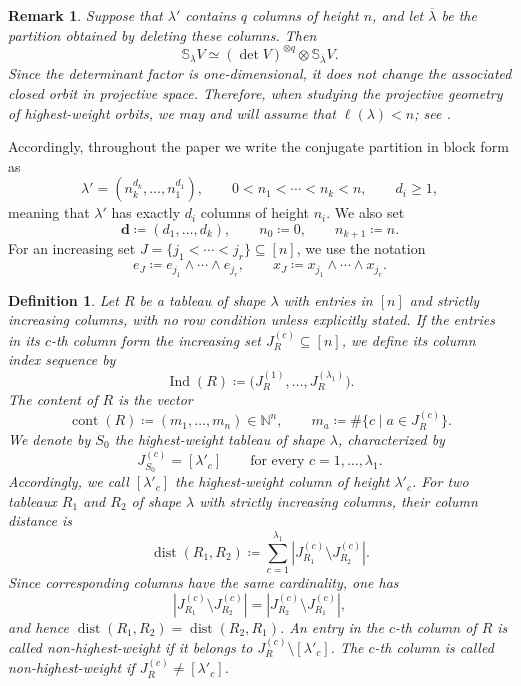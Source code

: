 \documentclass[a4paper,reqno]{amsart}
\theoremstyle{plainnopunct}
\theoremstyle{definitionnopunct}
\newtheorem{definition}[definition]{Definition}
\newtheorem{remark}[remark]{Remark}
\newcommand{\N}{\mathbb{N}}
\renewcommand{\S}{\mathbb{S}}
\newcommand{\ind}{\operatorname{Ind}}
\newcommand{\dist}{\operatorname{dist}}
\newcommand{\bd}{\mathbf{d}}
\DeclareMathOperator{\cont}{cont}
\begin{document}
\begin{remark}\label{rem: determinant twist}
Suppose that $\lambda'$ contains $q$ columns of height $n$, and let $\overline{\lambda}$ be the partition obtained by deleting these columns. Then
\[
\S_\lambda V
\simeq
(\det V)^{\otimes q}\otimes\S_{\overline{\lambda}}V.
\]
Since the determinant factor is one-dimensional, it does not change the associated closed orbit in projective space. Therefore, when studying the projective geometry of highest-weight orbits, we may and will assume that $\ell(\lambda)<n$; see \cite{FultonHarris1991}.
\end{remark}

Accordingly, throughout the paper we write the conjugate partition in block form as
\[\lambda'
=
(n_k^{d_k},\ldots,n_1^{d_1}),
\qquad
0<n_1<\cdots<n_k<n,
\qquad
d_i\geq1,
\]meaning that $\lambda'$ has exactly $d_i$ columns of height $n_i$. We also set
\[
\bd
\coloneq
(d_1,\ldots,d_k),
\qquad
n_0\coloneq0,
\qquad
n_{k+1}\coloneq n.
\]
For an increasing set 
$J=\{j_1<\cdots<j_r\}\subseteq[n]$,
we use the notation
\[
e_J
\coloneq
e_{j_1}\wedge\cdots\wedge e_{j_r},
\qquad
x_J
\coloneq
x_{j_1}\wedge\cdots\wedge x_{j_r}.
\]

\begin{definition}
\label{def: tableau data}
Let $R$ be a tableau of shape $\lambda$ with entries in $[n]$ and strictly increasing columns, with no row condition unless explicitly stated. If the entries in its $c$-th column form the increasing set $J_R^{(c)}\subseteq[n]$, we define its \emph{column index sequence} by
\[
\ind(R)
\coloneq
\bigl(
J_R^{(1)},\ldots,J_R^{(\lambda_1)}
\bigr).
\]
The \emph{content} of $R$ is the vector
\[
\cont(R)
\coloneq
(m_1,\ldots,m_n)\in\N^n,
\qquad
m_a
\coloneq
\#\bigl\{
c\mid a\in J_R^{(c)}
\bigr\}.
\]
We denote by $S_0$ the \emph{highest-weight tableau} of shape $\lambda$, characterized by
\[
J_{S_0}^{(c)}
=
[\lambda'_c]
\qquad
\text{for every }
c=1,\ldots,\lambda_1.
\]
Accordingly, we call $[\lambda'_c]$ the highest-weight column of height $\lambda'_c$.
For two tableaux $R_1$ and $R_2$ of shape $\lambda$ with strictly increasing columns, their \emph{column distance} is
\[
\dist(R_1,R_2)
\coloneq
\sum_{c=1}^{\lambda_1}
\left|
J_{R_1}^{(c)}
\setminus
J_{R_2}^{(c)}
\right|.
\]
Since corresponding columns have the same cardinality, one has
\[
\left|
J_{R_1}^{(c)}
\setminus
J_{R_2}^{(c)}
\right|
=
\left|
J_{R_2}^{(c)}
\setminus
J_{R_1}^{(c)}
\right|,
\]
and hence $\dist(R_1,R_2)=\dist(R_2,R_1)$.
An entry in the $c$-th column of $R$ is called \emph{non-highest-weight} if it belongs to $J_R^{(c)}\setminus[\lambda'_c]$.
The $c$-th column is called non-highest-weight if $J_R^{(c)}
\neq
[\lambda'_c]$.
\end{definition}
\end{document}
